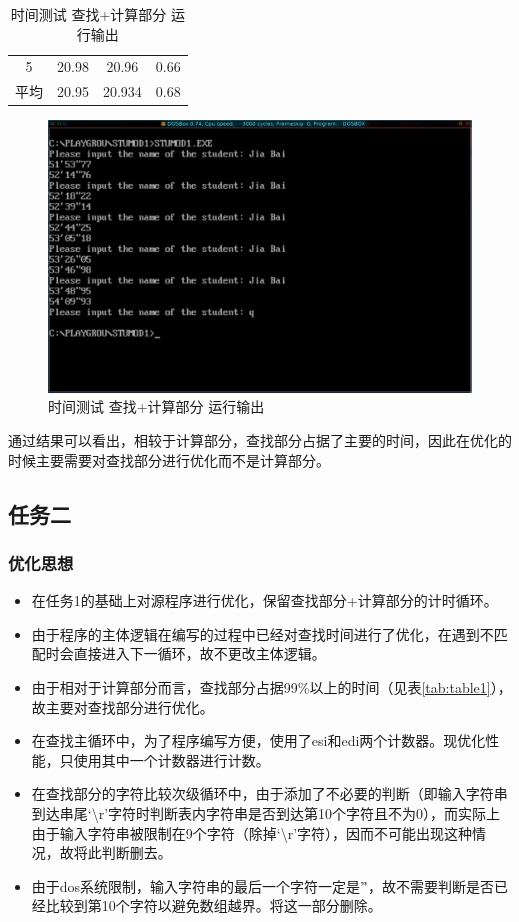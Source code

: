 \documentclass{article}
\begin{document}
\begin{enumerate}
\begin{table}[H]
\begin{tabular}{c c c c}
					5 & 20.98 & 20.96 & 0.66 \\
					\cmidrule(lr){1-1}\cmidrule(lr){2-4}
					平均 & 20.95 & 20.934 & 0.68 \\
					\bottomrule
				\end{tabular}
				\begin{figure}[H]
					\centering
					\includegraphics[width=0.9\linewidth]{res/homework_2/time.png}
					\caption{时间测试 查找+计算部分 运行输出}
					\label{fig:time}
				\end{figure}
			\end{table}
			通过结果可以看出，相较于计算部分，查找部分占据了主要的时间，因此在优化的时候主要需要对查找部分进行优化而不是计算部分。
	\end{enumerate}

	\subsection{任务二}
	\subsubsection{优化思想}
	\begin{itemize}
		\item 在任务1的基础上对源程序进行优化，保留查找部分+计算部分的计时循环。
		\item 由于程序的主体逻辑在编写的过程中已经对查找时间进行了优化，在遇到不匹配时会直接进入下一循环，故不更改主体逻辑。
		\item 由于相对于计算部分而言，查找部分占据99\%以上的时间（见表\ref{tab:table1}），故主要对查找部分进行优化。
		\item 在查找主循环中，为了程序编写方便，使用了esi和edi两个计数器。现优化性能，只使用其中一个计数器进行计数。
		\item 在查找部分的字符比较次级循环中，由于添加了不必要的判断（即输入字符串到达串尾`\textbackslash r'字符时判断表内字符串是否到达第10个字符且不为0），而实际上由于输入字符串被限制在9个字符（除掉`\textbackslash r'字符），因而不可能出现这种情况，故将此判断删去。
		\item 由于dos系统限制，输入字符串的最后一个字符一定是'\r'，故不需要判断是否已经比较到第10个字符以避免数组越界。将这一部分删除。
	\end{itemize}
\end{document}

